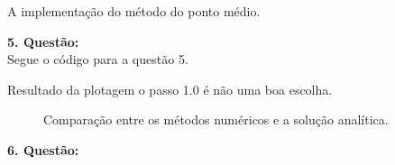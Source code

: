 \documentclass[a4paper,12pt]{article}
\begin{document}
A implementa\c c\~ao do m\'etodo do ponto m\'edio.

\textbf{5. Quest\~ao:}\\
Segue o c\'odigo para a quest\~ao 5.

Resultado da plotagem o passo 1.0 \'e n\~ao uma boa escolha.

	\begin{figure}[!ht]
		\centering
		\label{fig4} 
		\caption{Compara\c c\~ao entre os m\'etodos num\'ericos e a solu\c c\~ao anal\'itica.}
	\end{figure}
\pagebreak
\textbf{6. Quest\~ao:}\\

\begin{figure}[!ht]
\end{figure}
\end{document}
